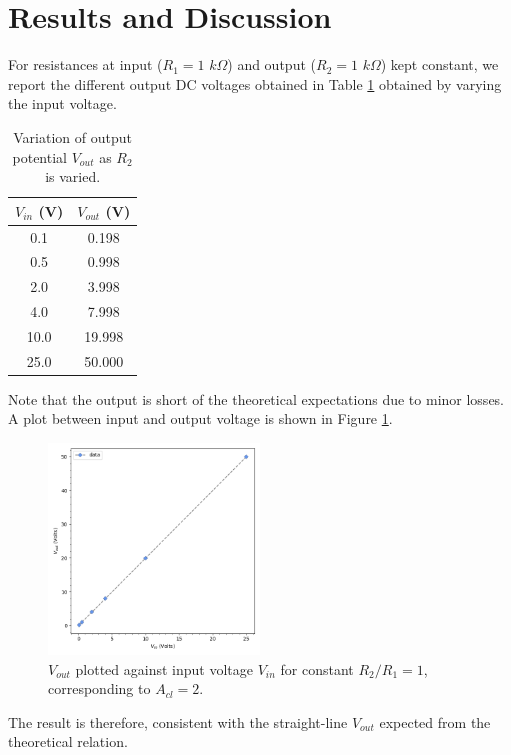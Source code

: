 \documentclass{article}
\begin{document}
	\section*{Results and Discussion}
	
	For resistances at input ($R_1 = 1$ $k\Omega$) and output ($R_2 = 1$ $k\Omega$) kept constant, we report the different output DC voltages obtained in Table \ref{tab:obs} obtained by varying the input voltage.
		
		\begin{table}[h!]
			\centering
			\begin{tabular}{|c|c|}
				\hline
				$V_{in}$ (V) & $V_{out}$ (V)\\
				\hline
				
				0.1 & 0.198 \\
				0.5 & 0.998 \\
				2.0 & 3.998 \\
				4.0 & 7.998 \\
				10.0 & 19.998 \\
				25.0 & 50.000 \\
				
				\hline
			\end{tabular}
		\caption{Variation of output potential $V_{out}$ as $R_2$ is varied. }
		\label{tab:obs}
		\end{table}
	
	Note that the output is short of the theoretical expectations due to minor losses. A plot between input and output voltage is shown in Figure \ref{fig:result}.
	
	\begin{figure}[h!]
		\centering
		\includegraphics[width=0.5\textwidth]{figure}
		\caption{$V_{out}$ plotted against input voltage $V_{in}$ for constant $R_2/R_1 = 1$, corresponding to $A_{cl} = 2$.}
		\label{fig:result}
	\end{figure}

	The result is therefore, consistent with the straight-line $V_{out}$ expected from the theoretical relation.
\end{document}
